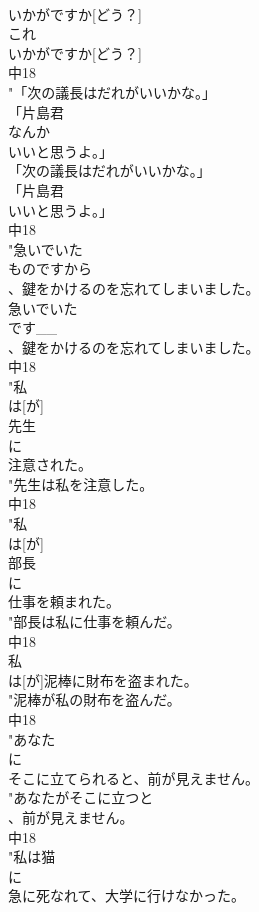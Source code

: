 \documentclass[8pt]{extreport}
\begin{document}
\begin{CJK}{UTF8}{min}
\\	いかがですか[どう？]
\\	これ
\\	いかがですか[どう？]
\\	中18
\\	"「次の議長はだれがいいかな。」
\\	「片島君
\\	なんか
\\	いいと思うよ。」
\\	「次の議長はだれがいいかな。」
\\	「片島君
\\	いいと思うよ。」
\\	中18
\\	"急いでいた
\\	ものですから
\\	、鍵をかけるのを忘れてしまいました。
\\	急いでいた
\\	です__
\\	、鍵をかけるのを忘れてしまいました。
\\	中18
\\	"私
\\	は[が]
\\	先生
\\	に
\\	注意された。
\\	"先生は私を注意した。
\\	中18
\\	"私
\\	は[が]
\\	部長
\\	に
\\	仕事を頼まれた。
\\	"部長は私に仕事を頼んだ。
\\	中18
\\	私
\\	は[が]泥棒に財布を盗まれた。	
\\	"泥棒が私の財布を盗んだ。
\\	中18
\\	"あなた
\\	に
\\	そこに立てられると、前が見えません。
\\	"あなたがそこに立つと
\\	、前が見えません。
\\	中18
\\	"私は猫
\\	に
\\	急に死なれて、大学に行けなかった。

\end{CJK}
\end{document}
